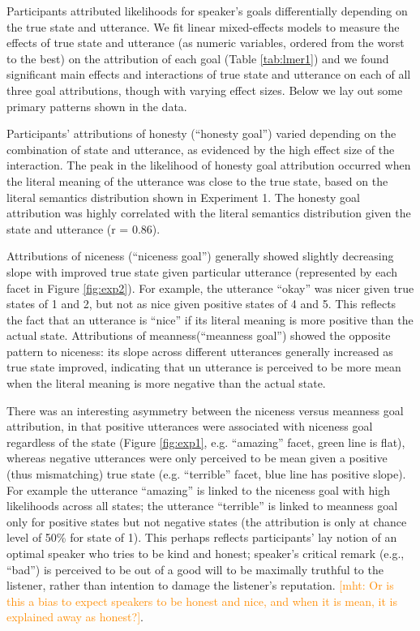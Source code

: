 \documentclass[10pt,letterpaper]{article}
\newcommand{\mht}[1]{\textcolor{DarkOrange}{[mht: #1]}}
\begin{document}
Participants attributed likelihoods for speaker's goals differentially depending on the true state and utterance. We fit linear mixed-effects models to measure the effects of true state and utterance (as numeric variables, ordered from the worst to the best) on the attribution of each goal (Table \ref{tab:lmer1}) and we found significant main effects and interactions of true state and utterance on each of all three goal attributions, though with varying effect sizes. Below we lay out some primary patterns shown in the data. %

Participants' attributions of honesty (``honesty goal'') varied depending on the combination of state and utterance, as evidenced by the high effect size of the interaction. The peak in the likelihood of honesty goal attribution occurred when the literal meaning of the utterance was close to the true state, based on the literal semantics distribution shown in Experiment 1. The honesty goal attribution was highly correlated with the literal semantics distribution given the state and utterance (r = 0.86).

Attributions of niceness (``niceness goal'') generally showed slightly decreasing slope with improved true state given particular utterance (represented by each facet in Figure \ref{fig:exp2}). For example, the utterance ``okay'' was nicer given true states of 1 and 2, but not as nice given positive states of 4 and 5. This reflects the fact that an utterance is ``nice'' if its literal meaning is more positive than the actual state. Attributions of meanness(``meanness goal'') showed the opposite pattern to niceness: its slope across different utterances generally increased as true state improved, indicating that un utterance is perceived to be more mean when the literal meaning is more negative than the actual state.

There was an interesting asymmetry between the niceness versus meanness goal attribution, in that positive utterances were associated with niceness goal regardless of the state (Figure \ref{fig:exp1}, e.g. ``amazing'' facet, green line is flat), whereas negative utterances were only perceived to be mean given a positive (thus mismatching) true state (e.g. ``terrible'' facet, blue line has positive slope). For example the utterance ``amazing'' is linked to the niceness goal with high likelihoods across all states; the utterance ``terrible'' is linked to meanness goal only for positive states but not negative states (the attribution is only at chance level of 50\% for state of 1). This perhaps reflects participants' lay notion of an optimal speaker who tries to be kind and honest; speaker's critical remark (e.g., ``bad'') is perceived to be out of a good will to be maximally truthful to the listener, rather than intention to damage the listener's reputation. \mht{Or is this a bias to expect speakers to be honest and nice, and when it is mean, it is explained away as honest?}.
\end{document}
